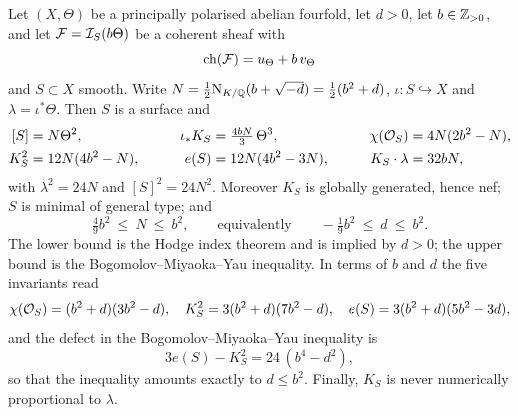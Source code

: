 \begin{theorem}\label{thm:smoothinvariants}
Let $(X,\Theta)$ be a principally polarised abelian fourfold, let $d>0$, let
$b\in\mathbb{Z}_{>0}$, and let $\mathcal{F}=\mathcal{I}_{S}(b\Theta)$ be a coherent sheaf with
\[
  \operatorname{ch}(\mathcal{F})=u_{\Theta}+b\,v_{\Theta}
\]
and $S\subset X$ smooth. Write $N=\tfrac12\mathrm{N}_{K/\mathbb{Q}}(b+\sqrt{-d})
=\tfrac12(b^{2}+d)$, $\iota\colon S\hookrightarrow X$ and
$\lambda=\iota^{*}\Theta$. Then $S$ is a surface and
\begin{equation}\label{eq:smoothinvariants}
\begin{aligned}
  [S]&=N\Theta^{2}, &\qquad \iota_{*}K_{S}&=\tfrac{4bN}{3}\,\Theta^{3},
  &\qquad \chi(\cO_{S})&=4N(2b^{2}-N),\\
  K_{S}^{2}&=12N(4b^{2}-N), &\qquad e(S)&=12N(4b^{2}-3N),
  &\qquad K_{S}\cdot\lambda&=32bN,
\end{aligned}
\end{equation}
with $\lambda^{2}=24N$ and $[S]^{2}=24N^{2}$. Moreover $K_{S}$ is globally
generated, hence nef; $S$ is minimal of general type; and
\begin{equation}\label{eq:threebounds}
  \tfrac{4}{9}b^{2}\ \le\ N\ \le\ b^{2},
  \qquad\text{equivalently}\qquad
  -\tfrac{1}{9}b^{2}\ \le\ d\ \le\ b^{2} .
\end{equation}
The lower bound is the Hodge index theorem and is implied by $d>0$; the upper
bound is the Bogomolov--Miyaoka--Yau inequality. In terms of $b$ and $d$ the
five invariants read
\begin{equation}\label{eq:bdform}
  \chi(\mathcal{O}_{S})=(b^{2}+d)(3b^{2}-d),\quad
  K_{S}^{2}=3(b^{2}+d)(7b^{2}-d),\quad
  e(S)=3(b^{2}+d)(5b^{2}-3d),
\end{equation}
and the defect in the Bogomolov--Miyaoka--Yau inequality is
\begin{equation}\label{eq:bmydefect}
  3e(S)-K_{S}^{2}=24\,(b^{4}-d^{2}),
\end{equation}
so that the inequality amounts exactly to $d\le b^{2}$.
Finally, $K_{S}$ is never numerically proportional to $\lambda$.
\end{theorem}

